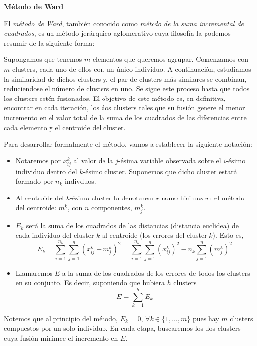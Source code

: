 \vspace{0.5cm}

\textbf{Método de Ward} \newline

El \textit{método de Ward}, también conocido como \textit{método de la suma incremental de cuadrados}, es un método jerárquico aglomerativo cuya filosofía la podemos resumir de la siguiente forma: \newline

Supongamos que tenemos $m$ elementos que queremos agrupar. Comenzamos con $m$ clusters, cada uno de ellos con un único individuo. A continuación, estudiamos la similaridad de dichos clusters y, el par de clusters más
similares se combinan, reduciendose el número de clusters en uno. Se sigue este proceso hasta que todos los clusters estén fusionados. El objetivo de este método es, en definitiva, encontrar en cada iteración, los dos 
clusters tales que su fusión genere el menor incremento en el valor total de la suma de los cuadrados de las diferencias entre cada elemento y el centroide del cluster. \newline

Para desarrollar formalmente el método, vamos a establecer la siguiente notación:

\begin{itemize}
    \item Notaremos por $x^{k}_{ij}$ al valor de la $j$-ésima variable observada sobre el $i$-ésimo individuo dentro del $k$-ésimo cluster. Suponemos que dicho cluster estará formado por $n_{k}$ indivduos.
    \item Al centroide del $k$-ésimo cluster lo denotaremos como hicimos en el método del centroide: $m^{k}$, con $n$ componentes, $m^{k}_{j}$.
    \item $E_{k}$ será la suma de los cuadrados de las distancias (distancia euclidea) de cada individuo del cluster $k$ al centroide (los errores del cluster $k$). Esto es,
    \[
    E_{k} = \sum_{i=1}^{n_{k}}\sum_{j=1}^{n}(x^{k}_{ij} - m^{k}_{j})^{2} = \sum_{i=1}^{n_{k}}\sum_{j=1}^{n}(x^{k}_{ij})^{2} - n_{k}\sum_{j=1}^{n}(m^{k}_{j})^{2}
    \]
    \item Llamaremos $E$ a la suma de los cuadrados de los errores de todos los clusters en su conjunto. Es decir, suponiendo que hubiera $h$ clusters
    \[
    E = \sum_{k=1}^{h} E_{k}
    \]
\end{itemize}


\begin{observacion}
    Notemos que al principio del método, $E_{k} = 0$, $\forall k \in \{1,\dots,m\}$ pues hay $m$ clusters compuestos por un solo individuo. \newline
    En cada etapa, buscaremos los dos clusters cuya fusión minimce el incremento en $E$.
\end{observacion}


